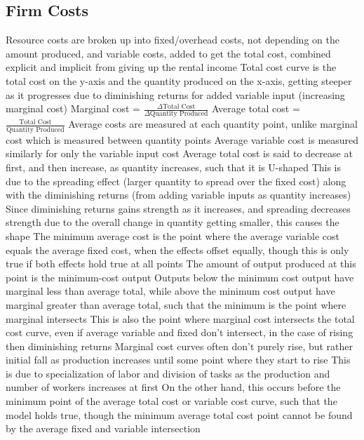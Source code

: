 \documentclass[11 pt, twoside]{article}
\newenvironment{outline*}
{
	\begin{outline}[enumerate]
	}
	{\end{outline}
}
\begin{document}
\subsection{Firm Costs}
\begin{outline*}
\1 Resource costs are broken up into fixed/overhead costs, not depending on the amount produced, and variable costs, added to get the total cost, combined explicit and implicit from giving up the rental income
\2 Total cost curve is the total cost on the y-axis and the quantity produced on the x-axis, getting steeper as it progresses due to diminishing returns for added variable input (increasing marginal cost)
\2 Marginal cost = $\frac{\Delta \text{Total Cost}}{\Delta \text{Quantity Produced}}$
\1 Average total cost = $\frac{\text{Total Cost}}{\text{Quantity Produced}}$
\2 Average costs are measured at each quantity point, unlike marginal cost which is measured between quantity points
\2 Average variable cost is measured similarly for only the variable input cost
\1 Average total cost is said to decrease at first, and then increase, as quantity increases, such that it is U-shaped
\2 This is due to the spreading effect (larger quantity to spread over the fixed cost) along with the diminishing returns (from adding variable inputs as quantity increases)
\3 Since diminishing returns gains strength as it increases, and spreading decreases strength due to the overall change in quantity getting smaller, this causes the shape
\2 The minimum average cost is the point where the average variable cost equals the average fixed cost, when the effects offset equally, though this is only true if both effects hold true at all points
\3 The amount of output produced at this point is the minimum-cost output
\3 Outputs below the minimum cost output have marginal less than average total, while above the minimum cost output have marginal greater than average total, such that the minimum is the point where marginal intersects
\3 This is also the point where marginal cost intersects the total cost curve, even if average variable and fixed don't intersect, in the case of rising then diminishing returns
\1 Marginal cost curves often don't purely rise, but rather initial fall as production increases until some point where they start to rise
\2 This is due to specialization of labor and division of tasks as the production and number of workers increases at first
\2 On the other hand, this occurs before the minimum point of the average total cost or variable cost curve, such that the model holds true, though the minimum average total cost point cannot be found by the average fixed and variable intersection
\end{outline*}
\end{document}
